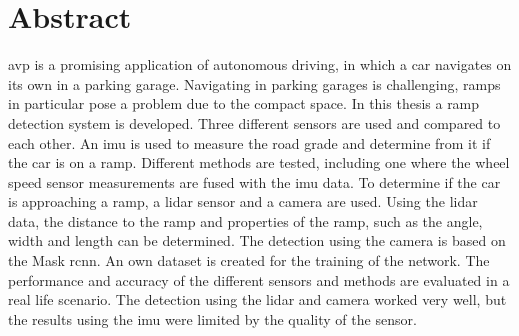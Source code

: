 \chapter*{Abstract}
\label{ch:Abstract}
\gls{avp} is a promising application of autonomous driving, in which a car navigates on its own in a parking garage.
Navigating in parking garages is challenging, ramps in particular pose a problem due to the compact space.
In this thesis a ramp detection system is developed.
Three different sensors are used and compared to each other.
An \gls{imu} is used to measure the road grade and determine from it if the car is on a ramp.
Different methods are tested, including one where the wheel speed sensor measurements are fused with the \gls{imu} data.
To determine if the car is approaching a ramp, a \gls{lidar} sensor and a camera are used.
Using the \gls{lidar} data, the distance to the ramp and properties of the ramp, such as the angle, width and length can be determined.
The detection using the camera is based on the Mask \gls{rcnn}.
An own dataset is created for the training of the network.
The performance and accuracy of the different sensors and methods are evaluated in a real life scenario.
The detection using the \gls{lidar} and camera worked very well, but the results using the \gls{imu} were limited by the quality of the sensor.
